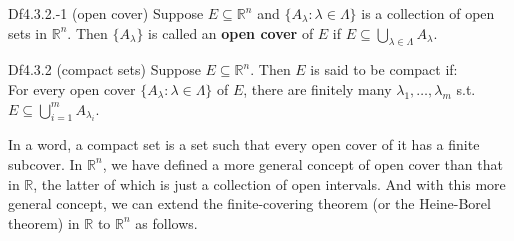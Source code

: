 \documentclass{article}
\begin{document}
\begin{Df}{Df4.3.2.-1 (open cover)}
    Suppose $E\subseteq\mathbb{R}^n$ and $\{A_\lambda: \lambda\in\Lambda\}$ is a collection of open sets in $\mathbb{R}^n$. Then $\{A_\lambda\}$ is called an \textbf{open cover} of $E$ if $E\subseteq\bigcup\limits_{\lambda\in\Lambda} A_\lambda$.
\end{Df}

\begin{Df}{Df4.3.2 (compact sets)}
    Suppose $E\subseteq\mathbb{R}^n$. Then $E$ is said to be compact if: \\
    For every open cover $\{A_\lambda: \lambda\in\Lambda\}$ of $E$, there are finitely many $\lambda_1, \dots, \lambda_m$ s.t. $E\subseteq \bigcup_{i=1}^m A_{\lambda_i}$.
\end{Df}

\begin{Rmk}{}
    In a word, a compact set is a set such that every open cover of it has a finite subcover. In $\mathbb{R}^n$, we have defined a more general concept of open cover than that in $\mathbb{R}$, the latter of which is just a collection of open intervals. And with this more general concept, we can extend the finite-covering theorem (or the Heine-Borel theorem) in $\mathbb{R}$ to $\mathbb{R}^n$ as follows.
\end{Rmk}
\end{document}
